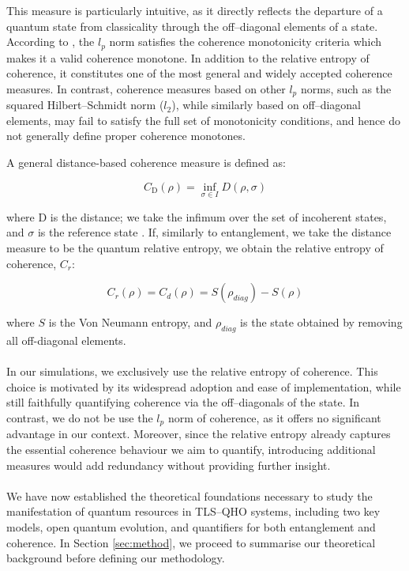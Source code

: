 \documentclass[11pt]{article}
\newcounter{subsubsubsection}[subsubsection]
\begin{document}
This measure is particularly intuitive, as it directly reflects the departure of a quantum state from classicality through the off--diagonal elements of a state. According to \cite{Coherence2014-seed}, the $l_p$ norm satisfies the coherence monotonicity criteria which makes it a valid coherence monotone. In addition to the relative entropy of coherence, it constitutes one of the most general and widely accepted coherence measures. In contrast, coherence measures based on other $l_p$ norms, such as the squared Hilbert–Schmidt norm ($l_2$), while similarly based on off--diagonal elements, may fail to satisfy the full set of monotonicity conditions, and hence do not generally define proper coherence monotones.


A general distance-based coherence measure is defined as:

\begin{equation}
    C_{\scriptscriptstyle\text{D}}(\rho) = \inf_{\sigma \in I} D(\rho,\sigma)
\end{equation}

where D is the distance; we take the infimum over the set of incoherent states, and $\sigma$ is the reference state \cite{Coherence2017-Colloquium}. If, similarly to entanglement, we take the distance measure to be the quantum relative entropy, we obtain the relative entropy of coherence, $C_r$:

\begin{equation} \label{rel_ent_coh}
C_r(\rho) = C_d(\rho) = S(\rho_{diag}) - S(\rho)
\end{equation}

where $S$ is the Von Neumann entropy, and $\rho_{diag}$ is the state obtained by removing all off-diagonal elements. \\
\\
In our simulations, we exclusively use the relative entropy of coherence. This choice is motivated by its widespread adoption and ease of implementation, while still faithfully quantifying coherence via the off--diagonals of the state. In contrast, we do not be use the $l_p$ norm of coherence, as it offers no significant advantage in our context. Moreover, since the relative entropy already captures the essential coherence behaviour we aim to quantify, introducing additional measures would add redundancy without providing further insight.\\
\\
We have now established the theoretical foundations necessary to study the manifestation of quantum resources in TLS--QHO systems, including two key models, open quantum evolution, and quantifiers for both entanglement and coherence. In Section \ref{sec:method}, we proceed to summarise our theoretical background before defining our methodology.
\end{document}
